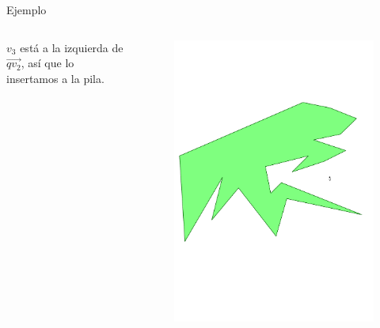 \documentclass[aspectratio=169,xcolor=dvipsnames, t]{beamer}
\begin{document}
\begin{frame}{Ejemplo}
  \begin{columns}
    \begin{column}{0.3\textwidth}
      \raggedright %
      $v_{3}$ está a la izquierda de $\overrightarrow{qv_{2}}$, así que lo insertamos a la pila.
    \end{column}
    \begin{column}{0.7\textwidth}
      \vspace{-2.5cm} %
      \begin{figure}
        \centering
        \includegraphics[width=1\linewidth, height=.95\textheight, page=12, keepaspectratio]{IPE/point_visibility.pdf}
      \end{figure}
    \end{column}
  \end{columns}
\end{frame}
\end{document}
